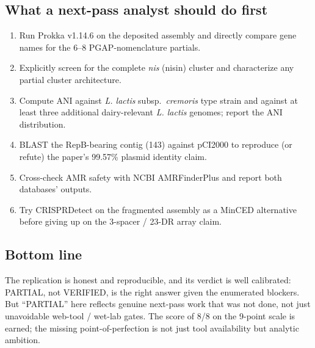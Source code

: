 \documentclass[11pt,letterpaper]{article}
\begin{document}
\subsection{What a next-pass analyst should do first}
\begin{enumerate}[leftmargin=1.4em]
\item Run Prokka v1.14.6 on the deposited assembly and directly
compare gene names for the 6--8 PGAP-nomenclature partials.
\item Explicitly screen for the complete \emph{nis} (nisin) cluster
and characterize any partial cluster architecture.
\item Compute ANI against \emph{L. lactis} subsp.\ \emph{cremoris}
type strain and against at least three additional dairy-relevant
\emph{L. lactis} genomes; report the ANI distribution.
\item BLAST the RepB-bearing contig (143) against pCI2000 to reproduce
(or refute) the paper's 99.57\% plasmid identity claim.
\item Cross-check AMR safety with NCBI AMRFinderPlus and report both
databases' outputs.
\item Try CRISPRDetect on the fragmented assembly as a MinCED
alternative before giving up on the 3-spacer / 23-DR array claim.
\end{enumerate}

\subsection{Bottom line}
The replication is honest and reproducible, and its verdict is well
calibrated: PARTIAL, not VERIFIED, is the right answer given the
enumerated blockers. But ``PARTIAL'' here reflects genuine
next-pass work that was not done, not just unavoidable web-tool /
wet-lab gates. The score of 8/8 on the 9-point scale is earned;
the missing point-of-perfection is not just tool availability
but analytic ambition.
\end{document}
